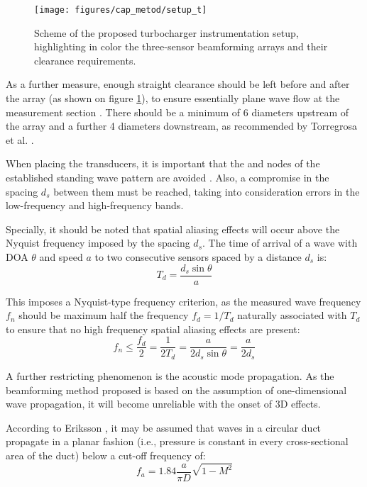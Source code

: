 \begin{figure}[b!]
\centering
\texttt{[image: figures/cap\_metod/setup\_t]}
\caption[Scheme of the proposed turbocharger instrumentation setup]{Scheme of the proposed turbocharger instrumentation setup, highlighting in color the three-sensor beamforming arrays and their clearance requirements.}
\label{fig:setup_schem}
\end{figure}

As a further measure, enough straight clearance should be left before and after the array (as shown on figure \ref{fig:setup_schem}), to ensure essentially plane wave flow at the measurement section \cite{holland2000measurement}. There should be a minimum of 6 diameters upstream of the array and a further 4 diameters downstream, as recommended by Torregrosa et al. \cite{torregrosa2005exp}.

When placing the transducers, it is important that the  and  nodes of the established standing wave pattern are avoided \cite{dowling1983sound}. Also, a compromise in the spacing $d_s$ between them must be reached, taking into consideration errors in the  low-frequency \cite{aabom1988error} and high-frequency \cite{seybert1988two} bands.

Specially, it should be noted that spatial aliasing effects will occur above the Nyquist frequency imposed by the spacing $d_s$. The time of arrival of a wave with DOA $\theta$ and speed $a$ to two consecutive sensors spaced by a distance $d_s$ is:
\begin{equation}
  T_d = \frac{d_s \sin \theta}{a}
\end{equation}

This imposes a Nyquist-type frequency criterion, as the measured wave frequency $f_n$ should be maximum half the frequency $f_d=1/T_d$ naturally associated with $T_d$ to ensure that no high frequency spatial aliasing effects are present:
\begin{equation}\label{eq:f_nyquist}
  f_n \leq \frac{f_d}{2} = \frac{1}{2T_d}=\frac{a}{2d_s \sin \theta}=\frac{a}{2d_s}
\end{equation}

A further restricting phenomenon is the acoustic mode propagation. As the beamforming method proposed is based on the assumption of one-dimensional wave propagation, it will become unreliable with the onset of 3D effects.

According to Eriksson \cite{eriksson1980higher}, it may be assumed that waves in a circular duct propagate in a planar fashion (i.e., pressure is constant in every cross-sectional area of the duct) below a cut-off frequency of:
\begin{equation}\label{eq:f_modes}
f_a = 1.84 \frac{a}{\pi D}\sqrt{1-M^2}
\end{equation}

